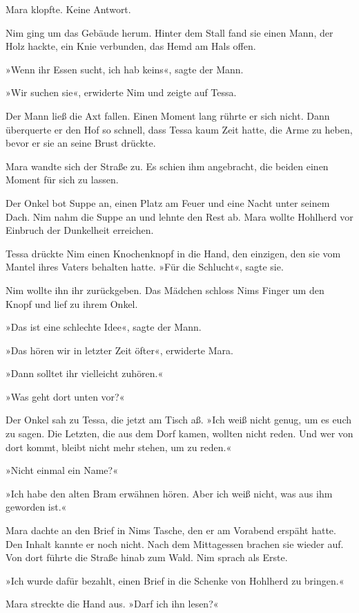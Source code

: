 \documentclass[10pt,a4paper]{article}
\begin{document}
Mara klopfte. Keine Antwort.

Nim ging um das Gebäude herum. Hinter dem Stall fand sie einen Mann, der Holz hackte, ein Knie verbunden, das Hemd am Hals offen.

»Wenn ihr Essen sucht, ich hab keins«, sagte der Mann.

»Wir suchen sie«, erwiderte Nim und zeigte auf Tessa.

Der Mann ließ die Axt fallen. Einen Moment lang rührte er sich nicht. Dann überquerte er den Hof so schnell, dass Tessa kaum Zeit hatte, die Arme zu heben, bevor er sie an seine Brust drückte.

Mara wandte sich der Straße zu. Es schien ihm angebracht, die beiden einen Moment für sich zu lassen.

Der Onkel bot Suppe an, einen Platz am Feuer und eine Nacht unter seinem Dach. Nim nahm die Suppe an und lehnte den Rest ab. Mara wollte Hohlherd vor Einbruch der Dunkelheit erreichen.

Tessa drückte Nim einen Knochenknopf in die Hand, den einzigen, den sie vom Mantel ihres Vaters behalten hatte. »Für die Schlucht«, sagte sie.

Nim wollte ihn ihr zurückgeben. Das Mädchen schloss Nims Finger um den Knopf und lief zu ihrem Onkel.

»Das ist eine schlechte Idee«, sagte der Mann.

»Das hören wir in letzter Zeit öfter«, erwiderte Mara.

»Dann solltet ihr vielleicht zuhören.«

»Was geht dort unten vor?«

Der Onkel sah zu Tessa, die jetzt am Tisch aß. »Ich weiß nicht genug, um es euch zu sagen. Die Letzten, die aus dem Dorf kamen, wollten nicht reden. Und wer von dort kommt, bleibt nicht mehr stehen, um zu reden.«

»Nicht einmal ein Name?«

»Ich habe den alten Bram erwähnen hören. Aber ich weiß nicht, was aus ihm geworden ist.«

Mara dachte an den Brief in Nims Tasche, den er am Vorabend erspäht hatte. Den Inhalt kannte er noch nicht.
Nach dem Mittagessen brachen sie wieder auf. Von dort führte die Straße hinab zum Wald. Nim sprach als Erste.

»Ich wurde dafür bezahlt, einen Brief in die Schenke von Hohlherd zu bringen.«

Mara streckte die Hand aus. »Darf ich ihn lesen?«
\end{document}
